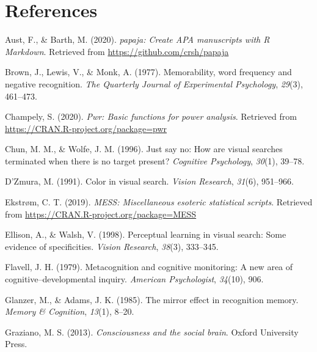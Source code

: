 \documentclass[
  english,
  man]{apa6}
\begin{document}
\hypertarget{references}{%
\section{References}\label{references}}

\begingroup
\setlength{\parindent}{-0.5in}
\setlength{\leftskip}{0.5in}

\hypertarget{refs}{}
\leavevmode\hypertarget{ref-R-papaja}{}%
Aust, F., \& Barth, M. (2020). \emph{papaja: Create APA manuscripts with R Markdown}. Retrieved from \url{https://github.com/crsh/papaja}

\leavevmode\hypertarget{ref-brown1977memorability}{}%
Brown, J., Lewis, V., \& Monk, A. (1977). Memorability, word frequency and negative recognition. \emph{The Quarterly Journal of Experimental Psychology}, \emph{29}(3), 461--473.

\leavevmode\hypertarget{ref-R-pwr}{}%
Champely, S. (2020). \emph{Pwr: Basic functions for power analysis}. Retrieved from \url{https://CRAN.R-project.org/package=pwr}

\leavevmode\hypertarget{ref-chun1996just}{}%
Chun, M. M., \& Wolfe, J. M. (1996). Just say no: How are visual searches terminated when there is no target present? \emph{Cognitive Psychology}, \emph{30}(1), 39--78.

\leavevmode\hypertarget{ref-d1991color}{}%
D'Zmura, M. (1991). Color in visual search. \emph{Vision Research}, \emph{31}(6), 951--966.

\leavevmode\hypertarget{ref-R-MESS}{}%
Ekstrøm, C. T. (2019). \emph{MESS: Miscellaneous esoteric statistical scripts}. Retrieved from \url{https://CRAN.R-project.org/package=MESS}

\leavevmode\hypertarget{ref-ellison1998perceptual}{}%
Ellison, A., \& Walsh, V. (1998). Perceptual learning in visual search: Some evidence of specificities. \emph{Vision Research}, \emph{38}(3), 333--345.

\leavevmode\hypertarget{ref-flavell1979metacognition}{}%
Flavell, J. H. (1979). Metacognition and cognitive monitoring: A new area of cognitive--developmental inquiry. \emph{American Psychologist}, \emph{34}(10), 906.

\leavevmode\hypertarget{ref-glanzer1985mirror}{}%
Glanzer, M., \& Adams, J. K. (1985). The mirror effect in recognition memory. \emph{Memory \& Cognition}, \emph{13}(1), 8--20.

\leavevmode\hypertarget{ref-graziano2013consciousness}{}%
Graziano, M. S. (2013). \emph{Consciousness and the social brain}. Oxford University Press.
\end{document}
